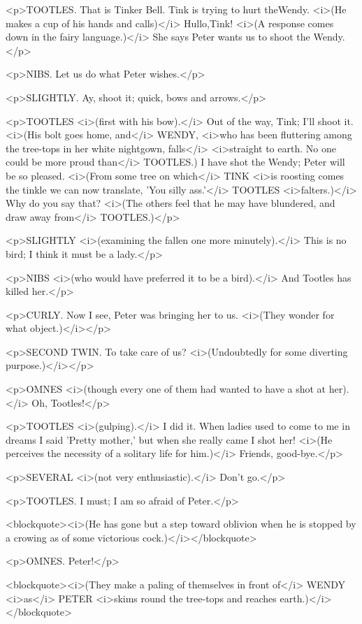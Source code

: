 <p>TOOTLES. That is Tinker Bell. Tink is trying to hurt theWendy.
<i>(He makes a cup of his hands and calls)</i> Hullo,Tink! <i>(A
response comes down in the fairy language.)</i> She says Peter wants
us to shoot the Wendy.</p>

<p>NIBS. Let us do what Peter wishes.</p>

<p>SLIGHTLY. Ay, shoot it; quick, bows and arrows.</p>

<p>TOOTLES <i>(first with his bow).</i> Out of the way, Tink; I'll
shoot it. <i>(His bolt goes home, and</i> WENDY, <i>who has been
fluttering among the tree-tops in her white nightgown, falls</i>
<i>straight to earth. No one could be more proud than</i> TOOTLES.) I
have shot the Wendy; Peter will be so pleased. <i>(From some tree on
which</i> TINK <i>is roosting comes the tinkle we can now translate,
'You silly ass.'</i> TOOTLES <i>falters.)</i> Why do you say that?
<i>(The others feel that he may have blundered, and draw away
from</i> TOOTLES.)</p>

<p>SLIGHTLY <i>(examining the fallen one more minutely).</i> This is
no bird; I think it must be a lady.</p>

<p>NIBS <i>(who would have preferred it to be a bird).</i> And
Tootles has killed her.</p>

<p>CURLY. Now I see, Peter was bringing her to us. <i>(They wonder
for what object.)</i></p>

<p>SECOND TWIN. To take care of us? <i>(Undoubtedly for some
diverting purpose.)</i></p>

<p>OMNES <i>(though every one of them had wanted to have a shot at
her).</i> Oh, Tootles!</p>

<p>TOOTLES <i>(gulping).</i> I did it. When ladies used to come to me
in dreams I said 'Pretty mother,' but when she really came I shot
her! <i>(He perceives the necessity of a solitary life for him.)</i>
Friends, good-bye.</p>

<p>SEVERAL <i>(not very enthusiastic).</i> Don't go.</p>

<p>TOOTLES. I must; I am so afraid of Peter.</p>

<blockquote><i>(He has gone but a step toward oblivion when he is
stopped by a crowing as of some victorious cock.)</i></blockquote>

<p>OMNES. Peter!</p>

<blockquote><i>(They make a paling of themselves in front of</i>
WENDY <i>as</i> PETER <i>skims round the tree-tops and reaches
earth.)</i></blockquote>

